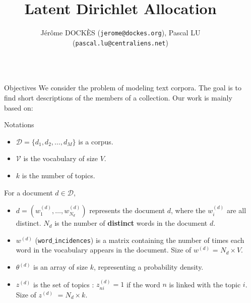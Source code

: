 \documentclass[final]{beamer}
\title{Latent Dirichlet Allocation \medskip} %
\author{J\'er\^ome DOCK\`ES {\small{(\texttt{jerome@dockes.org})}}, Pascal LU  {\small{(\texttt{pascal.lu@centraliens.net})}} } %
\institute{\'Ecole Normale Sup\'erieure de Cachan $-$ \today} %
\newlength{\sepwid}
\newlength{\onecolwid}
\begin{document}

\setlength{\belowcaptionskip}{2ex} %
\setlength\belowdisplayshortskip{2ex} %

\begin{frame}[t] 
\begin{columns}[t]


\begin{column}{\sepwid}\end{column} %

\begin{column}{\onecolwid}

\begin{alertblock}{Objectives}
We consider the problem of modeling text corpora. The goal is to find short descriptions of the members of a collection. Our work is mainly based on:
\nocite{*}
\small{}
\end{alertblock}


\begin{block}{Notations}
\begin{itemize}
  \item $\mathcal{D} = \{d_{1},d_{2}, \ldots, d_{M}\}$ is a corpus.
  \item $\mathcal{V}$ is the vocabulary of size $V$.
  \item $k$ is the number of topics.
\end{itemize}

For a document $d \in \mathcal{D}$,
\begin{itemize}  
  \item $d = (w_1^{(d)}, \ldots, w_{N_d}^{(d)})$ represents the document $d$, where the $w_i^{(d)}$ are all distinct. $N_d$ is the number of \textbf{distinct} words in the document $d$.
  \item $w^{(d)}$ (\texttt{word$\_$incidences}) is a matrix containing the number of times each word in the vocabulary appears in the document. Size of $w^{(d)}$ = $N_d \times V$.
 \item $\theta^{(d)}$ is an array of size $k$, representing a probability density.
 \item $z^{(d)}$ is the set of topics : $z_{ni}^{(d)} =  1$ if the word $n$ is linked with the topic $i$. Size of $z^{(d)}$ $= N_d \times k$.
\end{itemize}
\end{block}


\end{column}
\end{columns}
\end{frame}
\end{document}
